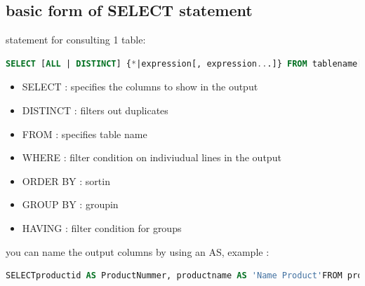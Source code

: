 \documentclass{report}
\begin{document}
	\subsection{basic form of SELECT statement}
	statement for consulting 1 table: 
	\begin{lstlisting}[language=SQL]
	SELECT [ALL | DISTINCT] {*|expression[, expression...]} FROM tablename[WHERE conditions(s)][GROUP BY column name [, column name ...][HAVING conditions(s)][ORDER BY {column name |seqnr}{ASC|DESC}[,...]\end{lstlisting}
	\begin{itemize}
		\item SELECT : specifies the columns to show in the output
		\item DISTINCT : filters out duplicates 
		\item FROM : specifies table name
		\item WHERE : filter condition on indiviudual lines in the output
		\item ORDER BY : sortin
		\item GROUP BY : groupin
		\item HAVING : filter condition for groups
	\end{itemize}
	
	you can name the output columns by using an AS, example : 
	\begin{lstlisting}[language=SQL]
	SELECTproductid AS ProductNummer, productname AS 'Name Product'FROM product\end{lstlisting}
\end{document}

